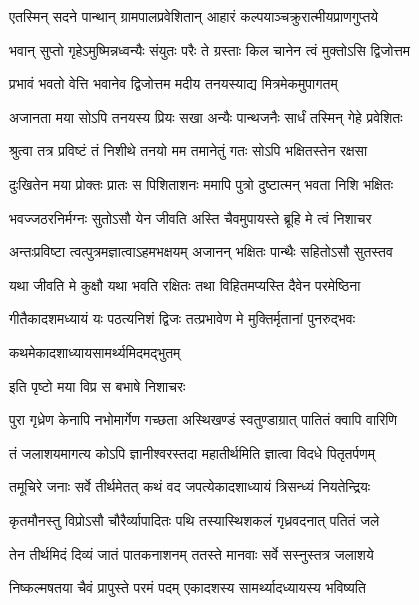 \twolineshloka
{एतस्मिन् सदने पान्थान् ग्रामपालप्रवेशितान्}
{आहारं कल्पयाञ्चक्रुरात्मीयप्राणगुप्तये} %

\twolineshloka
{भवान् सुप्तो गृहेऽमुष्मिन्नध्वन्यैः संयुतः परैः}
{ते ग्रस्ताः किल चानेन त्वं मुक्तोऽसि द्विजोत्तम} %

\twolineshloka
{प्रभावं भवतो वेत्ति भवानेव द्विजोत्तम}
{मदीय तनयस्याद्य मित्रमेकमुपागतम्} %

\twolineshloka
{अजानता मया सोऽपि तनयस्य प्रियः सखा}
{अन्यैः पान्थजनैः सार्धं तस्मिन् गेहे प्रवेशितः} %

\twolineshloka
{श्रुत्वा तत्र प्रविष्टं तं निशीथे तनयो मम}
{तमानेतुं गतः सोऽपि भक्षितस्तेन रक्षसा} %

\twolineshloka
{दुःखितेन मया प्रोक्तः प्रातः स पिशिताशनः}
{ममापि पुत्रो दुष्टात्मन् भवता निशि भक्षितः} %

\twolineshloka
{भवज्जठरनिर्मग्नः सुतोऽसौ येन जीवति}
{अस्ति चैवमुपायस्ते ब्रूहि मे त्वं निशाचर} %


\twolineshloka
{अन्तःप्रविष्टा त्वत्पुत्रमज्ञात्वाऽहमभक्षयम्}
{अजानन् भक्षितः पान्थैः सहितोऽसौ सुतस्तव} %

\twolineshloka
{यथा जीवति मे कुक्षौ यथा भवति रक्षितः}
{तथा विहितमप्यस्ति दैवेन परमेष्ठिना} %

\twolineshloka
{गीतैकादशमध्यायं यः पठत्यनिशं द्विजः}
{तत्प्रभावेण मे मुक्तिर्मृतानां पुनरुद्भवः} %


\onelineshloka
{कथमेकादशाध्यायसामर्थ्यमिदमद्भुतम्} %

\onelineshloka
{इति पृष्टो मया विप्र स बभाषे निशाचरः} %

\twolineshloka
{पुरा गृध्रेण केनापि नभोमार्गेण गच्छता}
{अस्थिखण्डं स्वतुण्डाग्रात् पातितं क्वापि वारिणि} %

\twolineshloka
{तं जलाशयमागत्य कोऽपि ज्ञानीश्वरस्तदा}
{महातीर्थमिति ज्ञात्वा विदधे पितृतर्पणम्} %

\twolineshloka
{तमूचिरे जनाः सर्वे तीर्थमेतत् कथं वद}
{जपत्येकादशाध्यायं त्रिसन्ध्यं नियतेन्द्रियः} %

\twolineshloka
{कृतमौनस्तु विप्रोऽसौ चौरैर्व्यापादितः पथि}
{तस्यास्थिशकलं गृध्रवदनात् पतितं जले} %

\twolineshloka
{तेन तीर्थमिदं दिव्यं जातं पातकनाशनम्}
{ततस्ते मानवाः सर्वे सस्नुस्तत्र जलाशये} %

\twolineshloka
{निष्कल्मषतया चैवं प्रापुस्ते परमं पदम्}
{एकादशस्य सामर्थ्यादध्यायस्य भविष्यति} %

